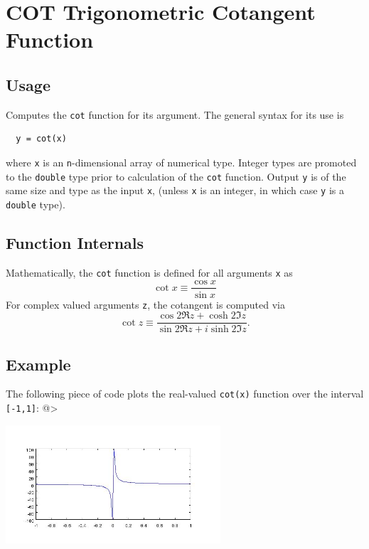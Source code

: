 \section{COT Trigonometric Cotangent Function}

\subsection{Usage}

Computes the \verb|cot| function for its argument.  The general
syntax for its use is
\begin{verbatim}
  y = cot(x)
\end{verbatim}
where \verb|x| is an \verb|n|-dimensional array of numerical type.
Integer types are promoted to the \verb|double| type prior to
calculation of the \verb|cot| function.  Output \verb|y| is of the
same size and type as the input \verb|x|, (unless \verb|x| is an
integer, in which case \verb|y| is a \verb|double| type).  
\subsection{Function Internals}

Mathematically, the \verb|cot| function is defined for all 
arguments \verb|x| as
\[
  \cot x \equiv \frac{\cos x}{\sin x}
\]
For complex valued arguments \verb|z|, the cotangent is computed via
\[
  \cot z \equiv \frac{\cos 2 \Re z + \cosh 2 \Im z}{\sin 2 \Re z + 
  i \sinh 2 \Im z}.
\]
\subsection{Example}

The following piece of code plots the real-valued \verb|cot(x)|
function over the interval \verb|[-1,1]|:
@>


\centerline{\includegraphics[width=8cm]{cotplot}}


